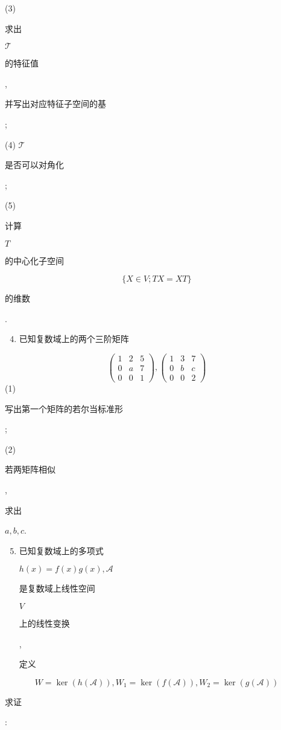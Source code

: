 \documentclass[10pt]{article}
\begin{document}
(3) \begin{CJK}{UTF8}{mj}求出\end{CJK} $\mathscr{T}$ \begin{CJK}{UTF8}{mj}的特征值\end{CJK}, \begin{CJK}{UTF8}{mj}并写出对应特征子空间的基\end{CJK};

(4) $\mathscr{T}$ \begin{CJK}{UTF8}{mj}是否可以对角化\end{CJK};

(5) \begin{CJK}{UTF8}{mj}计算\end{CJK} $T$ \begin{CJK}{UTF8}{mj}的中心化子空间\end{CJK}
$$
\{X \in V ; T X=X T\}
$$
\begin{CJK}{UTF8}{mj}的维数\end{CJK}.

\begin{enumerate}
  \setcounter{enumi}{3}
  \item \begin{CJK}{UTF8}{mj}已知复数域上的两个三阶矩阵\end{CJK}
\end{enumerate}
$$
\left(\begin{array}{lll}
1 & 2 & 5 \\
0 & a & 7 \\
0 & 0 & 1
\end{array}\right),\left(\begin{array}{lll}
1 & 3 & 7 \\
0 & b & c \\
0 & 0 & 2
\end{array}\right)
$$
(1) \begin{CJK}{UTF8}{mj}写出第一个矩阵的若尔当标准形\end{CJK};

(2) \begin{CJK}{UTF8}{mj}若两矩阵相似\end{CJK}, \begin{CJK}{UTF8}{mj}求出\end{CJK} $a, b, c$.

\begin{enumerate}
  \setcounter{enumi}{4}
  \item \begin{CJK}{UTF8}{mj}已知复数域上的多项式\end{CJK} $h(x)=f(x) g(x), \mathscr{A}$ \begin{CJK}{UTF8}{mj}是复数域上线性空间\end{CJK} $V$ \begin{CJK}{UTF8}{mj}上的线性变换\end{CJK}, \begin{CJK}{UTF8}{mj}定义\end{CJK}
\end{enumerate}
$$
W=\operatorname{ker}(h(\mathscr{A})), W_{1}=\operatorname{ker}(f(\mathscr{A})), W_{2}=\operatorname{ker}(g(\mathscr{A}))
$$
\begin{CJK}{UTF8}{mj}求证\end{CJK}:
\end{document}
